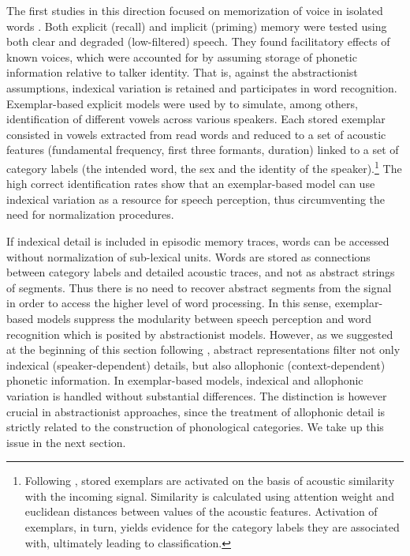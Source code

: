The first studies in this direction focused on memorization of voice in isolated words \citep{goldinger1991nature,schacter1992auditory,palmeri1993episodic,church1994perceptual,goldinger1996words}. Both explicit (recall) and implicit (priming) memory were tested using both clear and degraded (low-filtered) speech. They found facilitatory effects of known voices, which were accounted for by assuming storage of phonetic information relative to talker identity. That is, against the abstractionist assumptions, indexical variation is retained and participates in word recognition. Exemplar-based explicit models were used by \citet{johnson1997speech} to simulate, among others, identification of different vowels across various speakers. Each stored exemplar consisted in vowels extracted from read words and reduced to a set of acoustic features (fundamental frequency, first three formants, duration) linked to a set of category labels (the intended word, the sex and the identity of the speaker).\footnote{Following \citet{nosofsky1988exemplar}, stored exemplars are activated on the basis of acoustic similarity with the incoming signal. Similarity is calculated using attention weight and euclidean distances between values of the acoustic features. Activation of exemplars, in turn, yields evidence for the category labels they are associated with, ultimately leading to classification.} The high correct identification rates show that an exemplar-based model can use indexical variation as a resource for speech perception, thus circumventing the need for normalization procedures.

If indexical detail is included in episodic memory traces, words can be accessed without normalization of sub-lexical units. Words are stored as connections between category labels and detailed acoustic traces, and not as abstract strings of segments. Thus there is no need to recover abstract segments from the signal in order to access the higher level of word processing. In this sense, exemplar-based models suppress the modularity between speech perception and word recognition which is posited by abstractionist models. However, as we suggested at the beginning of this section following \citet{luce2003abstractness}, abstract representations filter not only indexical (speaker-dependent) details, but also allophonic (context-dependent) phonetic information. In exemplar-based models, indexical and allophonic variation is handled without substantial differences. The distinction is however crucial in abstractionist approaches, since the treatment of allophonic detail is strictly related to the construction of phonological categories. We take up this issue in the next section.

